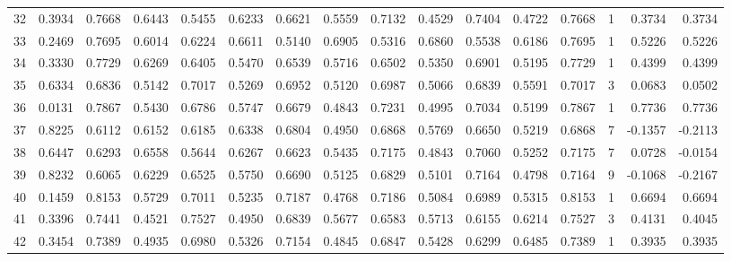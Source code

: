 \begin{tabular}{lrrrrrrrrrrrrrrr}
32  &      0.3934 &  0.7668 &  0.6443 &  0.5455 &  0.6233 &  0.6621 &  0.5559 &  0.7132 &  0.4529 &  0.7404 &   0.4722 &     0.7668 &      1 &                    0.3734 &                     0.3734 \\
33  &      0.2469 &  0.7695 &  0.6014 &  0.6224 &  0.6611 &  0.5140 &  0.6905 &  0.5316 &  0.6860 &  0.5538 &   0.6186 &     0.7695 &      1 &                    0.5226 &                     0.5226 \\
34  &      0.3330 &  0.7729 &  0.6269 &  0.6405 &  0.5470 &  0.6539 &  0.5716 &  0.6502 &  0.5350 &  0.6901 &   0.5195 &     0.7729 &      1 &                    0.4399 &                     0.4399 \\
35  &      0.6334 &  0.6836 &  0.5142 &  0.7017 &  0.5269 &  0.6952 &  0.5120 &  0.6987 &  0.5066 &  0.6839 &   0.5591 &     0.7017 &      3 &                    0.0683 &                     0.0502 \\
36  &      0.0131 &  0.7867 &  0.5430 &  0.6786 &  0.5747 &  0.6679 &  0.4843 &  0.7231 &  0.4995 &  0.7034 &   0.5199 &     0.7867 &      1 &                    0.7736 &                     0.7736 \\
37  &      0.8225 &  0.6112 &  0.6152 &  0.6185 &  0.6338 &  0.6804 &  0.4950 &  0.6868 &  0.5769 &  0.6650 &   0.5219 &     0.6868 &      7 &                   -0.1357 &                    -0.2113 \\
38  &      0.6447 &  0.6293 &  0.6558 &  0.5644 &  0.6267 &  0.6623 &  0.5435 &  0.7175 &  0.4843 &  0.7060 &   0.5252 &     0.7175 &      7 &                    0.0728 &                    -0.0154 \\
39  &      0.8232 &  0.6065 &  0.6229 &  0.6525 &  0.5750 &  0.6690 &  0.5125 &  0.6829 &  0.5101 &  0.7164 &   0.4798 &     0.7164 &      9 &                   -0.1068 &                    -0.2167 \\
40  &      0.1459 &  0.8153 &  0.5729 &  0.7011 &  0.5235 &  0.7187 &  0.4768 &  0.7186 &  0.5084 &  0.6989 &   0.5315 &     0.8153 &      1 &                    0.6694 &                     0.6694 \\
41  &      0.3396 &  0.7441 &  0.4521 &  0.7527 &  0.4950 &  0.6839 &  0.5677 &  0.6583 &  0.5713 &  0.6155 &   0.6214 &     0.7527 &      3 &                    0.4131 &                     0.4045 \\
42  &      0.3454 &  0.7389 &  0.4935 &  0.6980 &  0.5326 &  0.7154 &  0.4845 &  0.6847 &  0.5428 &  0.6299 &   0.6485 &     0.7389 &      1 &                    0.3935 &                     0.3935 \\

\end{tabular}
